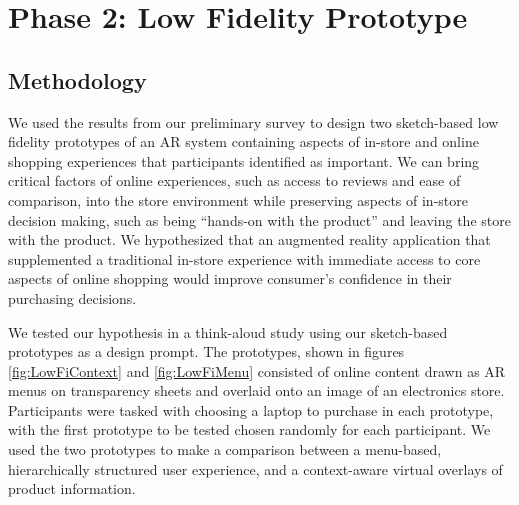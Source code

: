 \section{Phase 2: Low Fidelity Prototype}
\subsection{Methodology}
We used the results from our preliminary survey to design two sketch-based low fidelity prototypes of an AR system containing aspects of in-store and online shopping experiences that participants identified as important.  We can bring critical factors of online experiences, such as access to reviews and ease of comparison, into the store environment while preserving aspects of in-store decision making, such as being ``hands-on with the product'' and leaving the store with the product. We hypothesized that an augmented reality application that supplemented a traditional in-store experience with immediate access to core aspects of online shopping would improve consumer's confidence in their purchasing decisions. 

We tested our hypothesis in a think-aloud study using our sketch-based prototypes as a design prompt.  The prototypes, shown in figures \ref{fig:LowFiContext} and \ref{fig:LowFiMenu} consisted of online content drawn as AR menus on transparency sheets and overlaid onto an image of an electronics store. Participants were tasked with choosing a laptop to purchase in each prototype, with the first prototype to be tested chosen randomly for each participant. We used the two prototypes to make a comparison between a menu-based, hierarchically structured user experience, and a context-aware virtual overlays of product information.  

